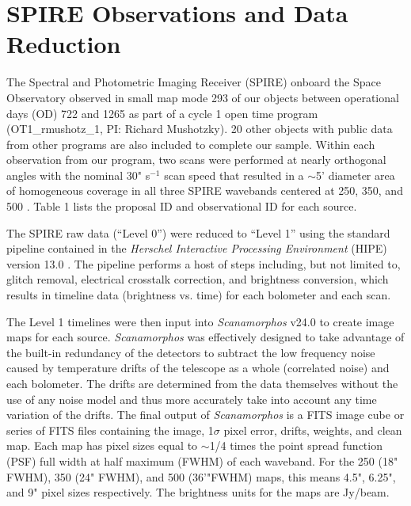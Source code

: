 \section{\herschel{} SPIRE Observations and Data Reduction}\label{sec:obs}
The Spectral and Photometric Imaging Receiver (SPIRE) \citep{Griffin:2010sf} onboard the \herschel{} Space Observatory \citep{Pilbratt:2010rz} observed in small map mode 293 of our objects between operational days (OD) 722 and 1265 as part of a cycle 1 open time program (OT1\_rmushotz\_1, PI: Richard Mushotzky). 20 other objects with public data from other programs are also included to complete our sample. Within each observation from our program, two scans were performed at nearly orthogonal angles with the nominal 30" s$^{-1}$ scan speed that resulted in a $\sim$5' diameter area of homogeneous coverage in all three SPIRE wavebands centered at 250, 350, and 500 \um. Table 1 lists the proposal ID and observational ID for each source.

The SPIRE raw data (``Level 0'') were reduced to ``Level 1'' using the standard pipeline contained in the \textit{Herschel Interactive Processing Environment} (HIPE) version 13.0 \citep{Ott:2010rm}. The pipeline performs a host of steps including, but not limited to, glitch removal, electrical crosstalk correction, and brightness conversion, which results in timeline data (brightness vs. time) for each bolometer and each scan. 

The Level 1 timelines were then input into \textit{Scanamorphos} v24.0 \citep{Roussel:2013gf} to create image maps for each source. \textit{Scanamorphos} was effectively designed to take advantage of the built-in redundancy of the detectors to subtract the low frequency noise caused by temperature drifts of the telescope as a whole (correlated noise) and each bolometer. The drifts are determined from the data themselves without the use of any noise model and thus more accurately take into account any time variation of the drifts. The final output of \textit{Scanamorphos} is a FITS image cube or series of FITS files containing the image, 1$\sigma$ pixel error, drifts, weights, and clean map. Each map has pixel sizes equal to $ \sim$1/4 times the point spread function (PSF) full width at half maximum (FWHM) of each waveband. For the 250 (18" FWHM), 350 (24" FWHM), and 500 \um{} (36'"FWHM) maps, this means 4.5", 6.25", and 9" pixel sizes respectively. The brightness units for the maps are Jy/beam.
  
  
  